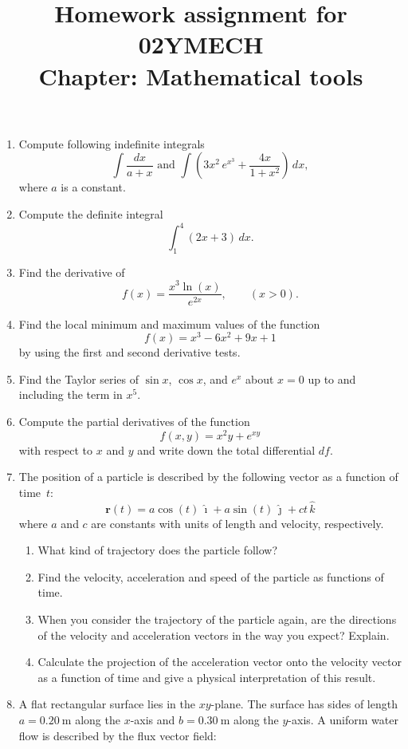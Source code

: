 \documentclass[12pt]{article}
\title{Homework assignment for 02YMECH \\ Chapter: Mathematical tools}
\begin{document}
\date{}
\maketitle
\vspace{-0.8in}
\begin{enumerate}
    \item Compute following indefinite integrals
          \[
            \int \frac{dx}{a+x} \text{ and } \int \left(3x^2 \, e^{x^3} + \frac{4x}{1 + x^2}\right)\,dx,
          \]
          where \(a\) is a constant.

    \item Compute the definite integral
         \[
           \int_{1}^{4} (2x + 3)\,dx.
         \]
    
    \item Find the derivative of
          \[
            f(x) = \frac{x^3 \ln(x)}{e^{2x}}, \qquad (x>0).
          \]
    
    \item  Find the local minimum and maximum values of the function
           \[
             f(x) = x^3 - 6x^2 + 9x + 1
           \]
           by using the first and second derivative tests. 
    
    \item Find the Taylor series of $\sin x$, $\cos x$, and $e^x$ about $x=0$ up to and including the term in $x^5$.

    \item Compute the partial derivatives of the function
      \[
        f(x, y) = x^2 y + e^{xy}
      \]
      with respect to \(x\) and \(y\) and write down the total differential \(df\).
    
    \item The position of a particle is described by the following vector as a function of time~\(t\):
          \[
        \mathbf{r}(t) = a\cos(t)\,\hat{\imath} + a\sin(t)\,\hat{\jmath} + ct\,\hat{k} 
          \]
          where \(a\) and \(c\) are constants with units of length and velocity, respectively.
          \begin{enumerate}
            \item What kind of trajectory does the particle follow?
            \item Find the velocity, acceleration and speed of the particle as functions of time. 
            \item When you consider the trajectory of the particle again, are the directions of the velocity and acceleration vectors in the way you expect? Explain.
            \item Calculate the projection of the acceleration vector onto the velocity vector as a function of time and give a physical interpretation of this result.
          \end{enumerate}
    \newpage
    \item A flat rectangular surface lies in the $xy$-plane. The surface has sides of length $a = 0.20~\mathrm{m}$ along the $x$-axis and $b = 0.30~\mathrm{m}$ along the $y$-axis. A uniform water flow is described by the flux vector field:


\end{enumerate}
\end{document}

